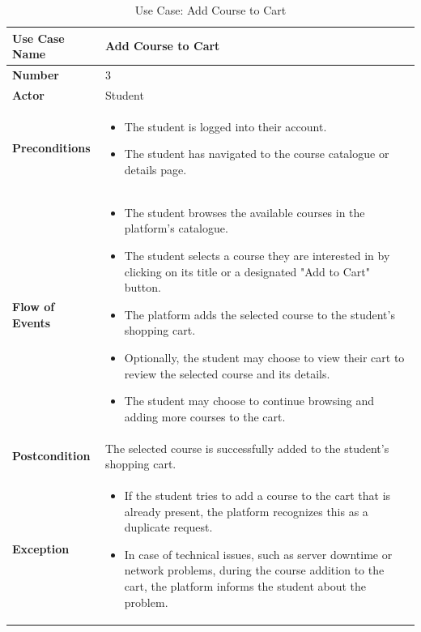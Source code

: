 \newpage

\begin{table}[h!]
    \centering
    \caption{Use Case: Add Course to Cart}
    \bgroup
    \def\arraystretch{1.5}%
    \begin{tabular}{|m{4cm}|m{11cm}|}
        \hline
        \textbf{Use Case Name} & Add Course to Cart \\
        \hline
        \textbf{Number} & 3 \\
        \hline
        \textbf{Actor} & Student \\
        \hline
        \textbf{Preconditions} & 
        \begin{itemize}[noitemsep,topsep=0pt] %
            \item The student is logged into their account.
            \item The student has navigated to the course catalogue or details page.
        \end{itemize} \\
        \hline
        \textbf{Flow of Events} & 
        \begin{itemize}[noitemsep,topsep=0pt]
            \item The student browses the available courses in the platform's catalogue.
            \item The student selects a course they are interested in by clicking on its title or a designated "Add to Cart" button.
            \item The platform adds the selected course to the student's shopping cart.
            \item Optionally, the student may choose to view their cart to review the selected course and its details.
            \item The student may choose to continue browsing and adding more courses to the cart.
        \end{itemize} \\
        \hline
        \textbf{Postcondition} & 
        The selected course is successfully added to the student's shopping cart. \\
        \hline
        \textbf{Exception} & 
        \begin{itemize}[noitemsep,topsep=0pt]
            \item If the student tries to add a course to the cart that is already present, the platform recognizes this as a duplicate request.
            \item In case of technical issues, such as server downtime or network problems, during the course addition to the cart, the platform informs the student about the problem.
        \end{itemize} \\
        \hline
    \end{tabular}
    \egroup
\end{table}

